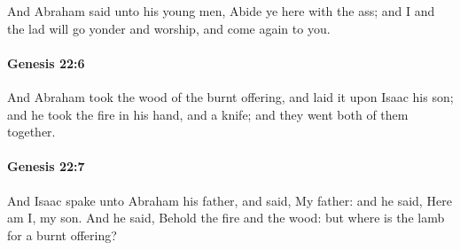 			And Abraham said unto his young men, Abide ye here with the ass; and I and the lad will go yonder and worship, and come again to you.


		\paragraph{Genesis 22:6} %
			\label{GENESIS-22-6}

			And Abraham took the wood of the burnt offering, and laid it upon Isaac his son; and he took the fire in his hand, and a knife; and they went both of them together.


		\paragraph{Genesis 22:7} %
			\label{GENESIS-22-7}

			And Isaac spake unto Abraham his father, and said, My father: and he said, Here am I, my son.  And he said, Behold the fire and the wood: but where is the lamb for a burnt offering?


